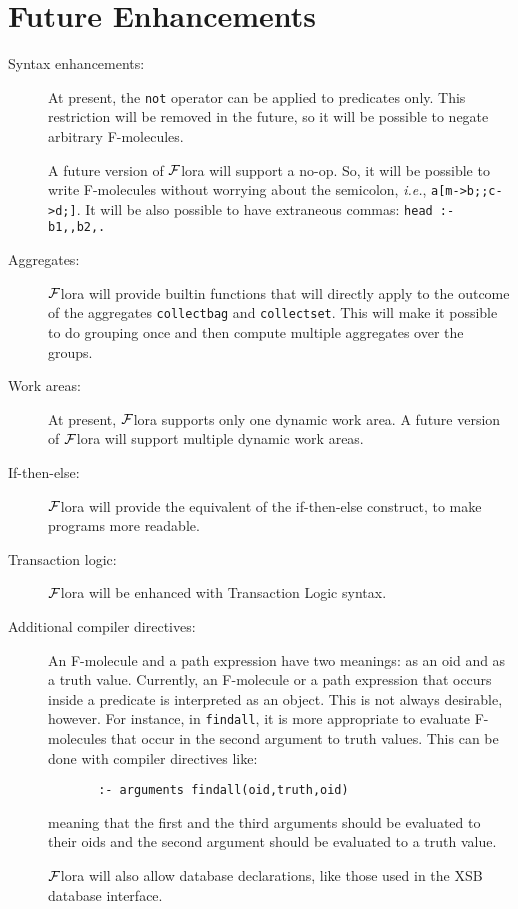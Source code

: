 \documentclass[11pt]{article}
\newcommand{\FLORA}{{\mbox{${\cal F}${\sc lora}}}\xspace}
\begin{document}
\section{Future Enhancements}

\begin{description}
  \item  [Syntax enhancements:]
    At present, the {\tt not} operator can be applied to predicates only.
    This restriction will be removed in the future, so it will be possible
    to negate arbitrary F-molecules.

    A future version of \FLORA will support a no-op. So, it will be possible
    to write F-molecules without worrying about the semicolon, {\it i.e.}, 
    {\tt a[m->b;;c->d;]}. It will be also possible to have extraneous commas:
    {\tt head :- b1,,b2,.}
  \item[Aggregates:] \FLORA will provide builtin functions that will
    directly apply to the outcome of the aggregates {\tt collectbag} and
    {\tt collectset}. This will make it possible to do grouping once and
    then compute multiple aggregates over the groups.
  \item[Work areas:] At present, \FLORA supports only one dynamic work area.
    A future version of \FLORA will support multiple dynamic work areas.
  \item[If-then-else:] \FLORA will provide the equivalent of the
    if-then-else construct, to make programs more readable.
  \item[Transaction logic:] \FLORA will be enhanced with Transaction Logic
    syntax.
  \item[Additional compiler directives:] An F-molecule and a path
    expression have two meanings: as an oid and as a truth value.
    Currently, an F-molecule or a path expression that occurs inside a
    predicate is interpreted as an object. This is not always desirable,
    however. For instance, in {\tt findall}, it is more appropriate to
    evaluate F-molecules that occur in the second argument to truth values.
    This can be done with compiler directives like:
    \begin{verbatim}
       :- arguments findall(oid,truth,oid)
    \end{verbatim}
    meaning that the first and the third arguments should be evaluated to
    their oids and the second argument should be evaluated to a truth
    value.

    \FLORA will also allow database declarations, like those 
    used in the XSB database interface.
\end{description}




\printindex
\end{document}
